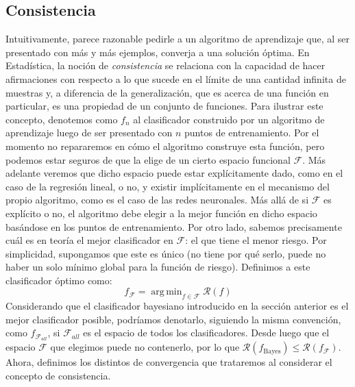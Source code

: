 \documentclass{report}
\DeclareMathOperator*{\argmin}{arg\,min}
\begin{document}
\subsection{Consistencia}
Intuitivamente, parece razonable pedirle a un algoritmo de aprendizaje que, al ser presentado con más y más ejemplos, converja a una
solución óptima. En Estadística, la noción de \textit{consistencia} se relaciona con la capacidad de hacer afirmaciones con respecto a lo que
sucede en el límite de una cantidad infinita de muestras y, a diferencia de la generalización, que es acerca de una función en particular,
es una propiedad de un conjunto de funciones. Para ilustrar este concepto, denotemos como $f_n$ al clasificador construido por un algoritmo
de aprendizaje luego de ser presentado con $n$ puntos de entrenamiento. Por el momento no repararemos en cómo el algoritmo construye esta
función, pero podemos estar seguros de que la elige de un cierto espacio funcional $\mathcal{F}$. Más adelante veremos que dicho espacio puede
estar explícitamente dado, como en el caso de la regresión lineal, o no, y existir implícitamente en el mecanismo del propio algoritmo,
como es el caso de las redes neuronales. Más allá de si $\mathcal{F}$ es explícito o no, el algoritmo debe elegir a la mejor función
en dicho espacio basándose en los puntos de entrenamiento. Por otro lado, sabemos precisamente cuál es en teoría el mejor clasificador 
en $\mathcal{F}$: el que tiene el menor riesgo. Por simplicidad, supongamos que este es único (no tiene por qué serlo, puede no haber
un solo mínimo global para la función de riesgo). Definimos a este clasificador óptimo como:
\[
f_{\mathcal{F}} = \argmin _{f\in{\mathcal{F}}} \mathcal{R}(f)
\]
Considerando que el clasificador bayesiano introducido en la sección anterior es el mejor clasificador posible, podríamos denotarlo,
siguiendo la misma convención, como $f_{\mathcal{F}_{all}}$, si $\mathcal{F}_{all}$ es el espacio de todos los clasificadores. Desde luego 
que el espacio $\mathcal{F}$ que elegimos 
puede no contenerlo, por lo que $\mathcal{R}(f_{\text{Bayes}}) \leq \mathcal{R}(f_{\mathcal{F}})$. 
Ahora, definimos los distintos de convergencia que trataremos al considerar el concepto de consistencia.
\end{document}
